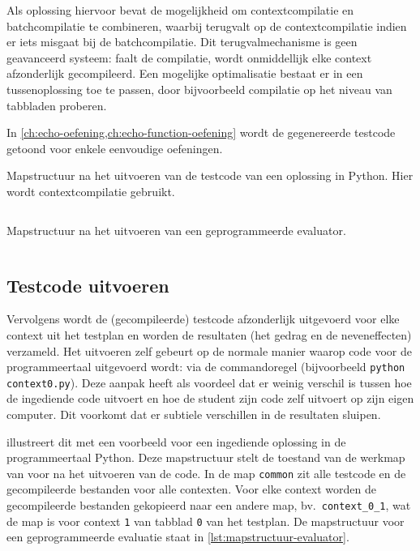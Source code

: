 Als oplossing hiervoor bevat \tested{} de mogelijkheid om contextcompilatie en batchcompilatie te combineren, waarbij \tested{} terugvalt op de contextcompilatie indien er iets misgaat bij de batchcompilatie.
Dit terugvalmechanisme is geen geavanceerd systeem: faalt de compilatie, wordt onmiddellijk elke context afzonderlijk gecompileerd.
Een mogelijke optimalisatie bestaat er in een tussenoplossing toe te passen, door bijvoorbeeld compilatie op het niveau van tabbladen proberen.

In \cref{ch:echo-oefening,ch:echo-function-oefening} wordt de gegenereerde testcode getoond voor enkele eenvoudige oefeningen.

\begin{listing}
    \caption{
    Mapstructuur na het uitvoeren van de testcode van een oplossing in Python.
    Hier wordt contextcompilatie gebruikt.
    }
    \label{lst:mapstructuur}
    \inputminted{text}{code/dirs-python-solution.txt}
\end{listing}

\begin{listing}
    \caption{Mapstructuur na het uitvoeren van een geprogrammeerde evaluator.}
    \label{lst:mapstructuur-evaluator}
    \inputminted{text}{code/dirs-python-eval.txt}
\end{listing}

\subsection{Testcode uitvoeren}\label{subsec:testcode-uitvoeren}

Vervolgens wordt de (gecompileerde) testcode afzonderlijk uitgevoerd voor elke context uit het testplan en worden de resultaten (het gedrag en de neveneffecten) verzameld.
Het uitvoeren zelf gebeurt op de normale manier waarop code voor de programmeertaal uitgevoerd wordt: via de commandoregel (bijvoorbeeld \texttt{python context0.py}).
Deze aanpak heeft als voordeel dat er weinig verschil is tussen hoe \tested{} de ingediende code uitvoert en hoe de student zijn code zelf uitvoert op zijn eigen computer.
Dit voorkomt dat er subtiele verschillen in de resultaten sluipen.

 illustreert dit met een voorbeeld voor een ingediende oplossing in de programmeertaal Python.
Deze mapstructuur stelt de toestand van de werkmap van \tested{} voor na het uitvoeren van de code.
In de map \texttt{common} zit alle testcode en de gecompileerde bestanden voor alle contexten.
Voor elke context worden de gecompileerde bestanden gekopieerd naar een andere map, bv.\ \texttt{context\_0\_1}, wat de map is voor context \texttt{1} van tabblad \texttt{0} van het testplan.
De mapstructuur voor een geprogrammeerde evaluatie staat in \cref{lst:mapstructuur-evaluator}.

